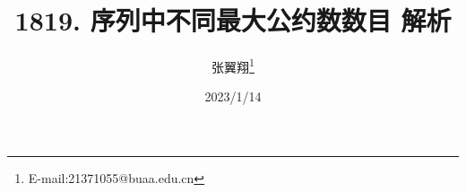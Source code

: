 \documentclass[12px]{ctexart}
\begin{document}
\title{1819. 序列中不同最大公约数数目 解析}
\author{张翼翔\thanks{E-mail:21371055@buaa.edu.cn}}
\date{2023/1/14}
\end{document}
